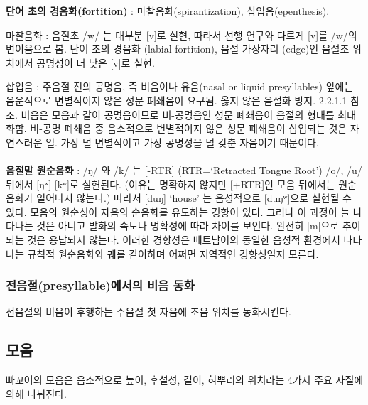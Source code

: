 {\textbf{단어 초의 경음화(fortition)}} : 마찰음화(spirantization), 삽입음(epenthesis).

마찰음화 : 음절초 /w/ 는 대부분 [v]로 실현, 따라서 선행 연구와 다르게 [v]를 /w/의 변이음으로 봄. 단어 초의 경음화 (labial fortition), 음절 가장자리 (edge)인 음절초 위치에서 공명성이 더 낮은 [v]로 실현.

삽입음 : 주음절 전의 공명음, 즉 비음이나 유음(nasal or liquid presyllables) 앞에는 음운적으로 변별적이지 않은 성문 폐쇄음이 요구됨. 옳지 않은 음절화 방지. 2.2.1.1 참조. 비음은 모음과 같이 공명음이므로 비-공명음인 성문 폐쇄음이 음절의 형태를 최대화함. 비-공명 폐쇄음 중 음소적으로 변별적이지 않은 성문 폐쇄음이 삽입되는 것은 자연스러운 일. 가장 덜 변별적이고 가장 공명성을 덜 갖춘 자음이기 때문이다.
\\
\\
{\textbf{음절말 원순음화}} : /ŋ/ 와 /k/ 는 [-RTR] (RTR=‘Retracted Tongue Root’) /o/, /u/ 뒤에서 [ŋʷ] [kʷ]로 실현된다. (이유는 명확하지 않지만 [+RTR]인 모음 뒤에서는 원순음화가 일어나지 않는다.) 따라서 [duŋ] ‘house’ 는 음성적으로 [duŋʷ]으로 실현될 수 있다. 모음의 원순성이 자음의 순음화를 유도하는 경향이 있다. 그러나 이 과정이 늘 나타나는 것은 아니고 발화의 속도나 명확성에 따라 차이를 보인다. 완전히 [m]으로 추이되는 것은 용납되지 않는다. 이러한 경향성은 베트남어의 동일한 음성적 환경에서 나타나는 규칙적 원순음화와 궤를 같이하며 어쩌면 지역적인 경향성일지 모른다.

\subsubsection{전음절(presyllable)에서의 비음 동화}

전음절의 비음이 후행하는 주음절 첫 자음에 조음 위치를 동화시킨다.

\subsection{모음}
빠꼬어의 모음은 음소적으로 높이, 후설성, 길이, 혀뿌리의 위치라는 4가지 주요 자질에 의해 나눠진다.
